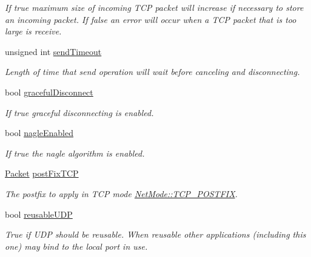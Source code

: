 \begin{DoxyCompactItemize}
\begin{DoxyCompactList}\small\item\em If true maximum size of incoming TCP packet will increase if necessary to store an incoming packet. If false an error will occur when a TCP packet that is too large is receive. \item\end{DoxyCompactList}\item 
unsigned int \hyperlink{class_net_instance_profile_a6cc36534bcb31e4411e2698e55908c18}{sendTimeout}
\begin{DoxyCompactList}\small\item\em Length of time that send operation will wait before canceling and disconnecting. \item\end{DoxyCompactList}\item 
bool \hyperlink{class_net_instance_profile_a73dbd928100dce63697399d8e21058eb}{gracefulDisconnect}
\begin{DoxyCompactList}\small\item\em If true graceful disconnecting is enabled. \item\end{DoxyCompactList}\item 
bool \hyperlink{class_net_instance_profile_a959f0b77c0e19d4f425c5c36b601ec8c}{nagleEnabled}
\begin{DoxyCompactList}\small\item\em If true the nagle algorithm is enabled. \item\end{DoxyCompactList}\item 
\hyperlink{class_packet}{Packet} \hyperlink{class_net_instance_profile_a6d540756a8887426bdff2cd7fa82e349}{postFixTCP}
\begin{DoxyCompactList}\small\item\em The postfix to apply in TCP mode \hyperlink{class_net_mode_a43cfa55ee6a4db66a8d7d6c27f766964abe08876125a416186e74c901f6d29ce4}{NetMode::TCP\_\-POSTFIX}. \item\end{DoxyCompactList}\item 
bool \hyperlink{class_net_instance_profile_ad73bd8106b0993d4f8c89f2293c7a4e2}{reusableUDP}
\begin{DoxyCompactList}\small\item\em True if UDP should be reusable. When reusable other applications (including this one) may bind to the local port in use. \item\end{DoxyCompactList}\item 

\end{DoxyCompactItemize}
